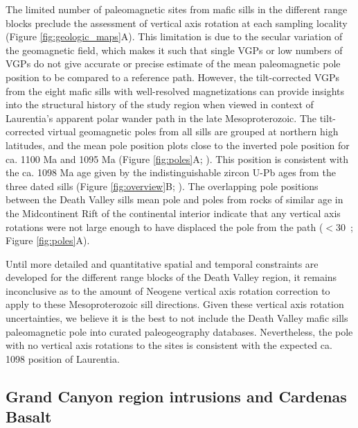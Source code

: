 The limited number of paleomagnetic sites from mafic sills in the different range blocks preclude the assessment of vertical axis rotation at each sampling locality (Figure \ref{fig:geologic_maps}A). This limitation is due to the secular variation of the geomagnetic field, which makes it such that single VGPs or low numbers of VGPs do not give accurate or precise estimate of the mean paleomagnetic pole position to be compared to a reference path. However, the tilt-corrected VGPs from the eight mafic sills with well-resolved magnetizations can provide insights into the structural history of the study region when viewed in context of Laurentia's apparent polar wander path in the late Mesoproterozoic. The tilt-corrected virtual geomagnetic poles from all sills are grouped at northern high latitudes, and the mean pole position plots close to the inverted pole position for ca. 1100 Ma and 1095 Ma (Figure \ref{fig:poles}A; \cite{Swanson-Hysell2019a}). This position is consistent with the ca. 1098 Ma age given by the indistinguishable zircon U-Pb ages from the three dated sills (Figure \ref{fig:overview}B; \cite{Mohr2024a}). The overlapping pole positions between the Death Valley sills mean pole and poles from rocks of similar age in the Midcontinent Rift of the continental interior indicate that any vertical axis rotations were not large enough to have displaced the pole from the path ($<$30\textdegree\ ; Figure \ref{fig:poles}A).

Until more detailed and quantitative spatial and temporal constraints are developed for the different range blocks of the Death Valley region, it remains inconclusive as to the amount of Neogene vertical axis rotation correction to apply to these Mesoproterozoic sill directions. Given these vertical axis rotation uncertainties, we believe it is the best to not include the Death Valley mafic sills paleomagnetic pole into curated paleogeography databases. Nevertheless, the pole with no vertical axis rotations to the sites is consistent with the expected ca. 1098 position of Laurentia.

\subsection*{Grand Canyon region intrusions and Cardenas Basalt}

